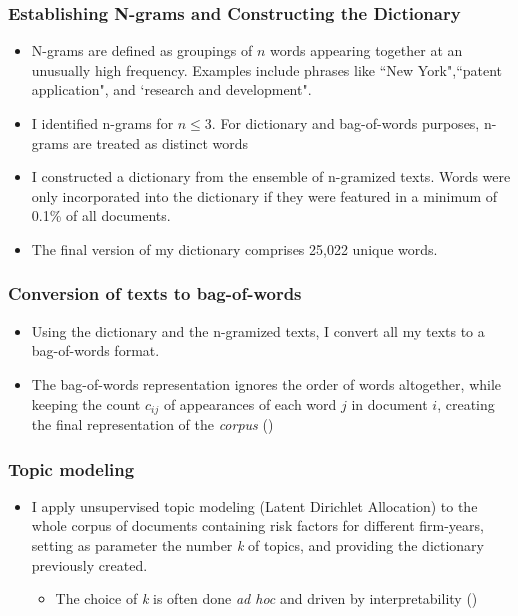 \documentclass{beamer}
\begin{document}
\begin{frame}
\frametitle{Establishing N-grams and Constructing the Dictionary}
\label{ngram_main}
\begin{itemize}
\item N-grams are defined as groupings of $n$ words appearing together at an unusually high frequency. Examples include phrases like ``New York",``patent application", and `research and development".\hyperlink{ngram_details}{}

\item I identified n-grams for $n \leq 3$. For dictionary and bag-of-words purposes, n-grams are treated as distinct words
\item I constructed a dictionary from the ensemble of n-gramized texts. Words were only incorporated into the dictionary if they were featured in a minimum of 0.1\% of all documents.

\item The final version of my dictionary comprises 25,022 unique words.
\end{itemize}
\normalsize
\end{frame}

\begin{frame}
\frametitle{Conversion of texts to bag-of-words}
\begin{itemize}
\item Using the dictionary and the n-gramized texts, I convert all my texts to a bag-of-words format.
\item The bag-of-words representation ignores the order of words altogether, while keeping the count $c_{ij}$ of appearances of each word $j$ in document $i$, creating the final representation of the \textit{corpus} (\cite{Gentzkow2019-va})
\end{itemize}
\end{frame}

\begin{frame}
\frametitle{Topic modeling}
\begin{itemize}
\item I apply unsupervised topic modeling (Latent Dirichlet Allocation) to the whole corpus of documents containing risk factors for different firm-years, setting as parameter the number \textit{k} of topics, and providing the dictionary previously created.
\begin{itemize}
  \item The choice of \textit{k} is often done \textit{ad hoc} and driven by interpretability (\cite{Gentzkow2019-va})
\end{itemize}
\end{itemize}
\end{frame}
\end{document}
